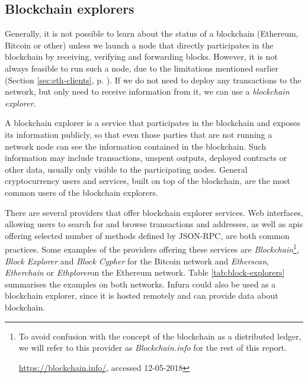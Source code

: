 \subsection{Blockchain explorers}\label{sec:block-explorers}
Generally, it is not possible to learn about the status of a blockchain (Ethereum, Bitcoin or other) unless we launch a node that directly participates in the blockchain by receiving, verifying and forwarding blocks. However, it is not always feasible to run such a node, due to the limitations mentioned earlier (Section \ref{sec:eth-clients}, p. \pageref{sec:eth-clients}). If we do not need to deploy any transactions to the network, but only need to receive information from it, we can use a \textit{blockchain explorer}\footnotemark.
% 

A blockchain explorer is a service that participates in the blockchain and exposes its information publicly, so that even those parties that are not running a network node can see the information contained in the blockchain. Such information may include transactions, unspent outputs, deployed contracts or other data, usually only visible to the participating nodes. General cryptocurrency users and services, built on top of the blockchain, are the most common users of the blockchain explorers\footnotemark.
%

There are several providers that offer blockchain explorer services. Web interfaces, allowing users to search for and browse transactions and addresses, as well as \acrshort{api}s offering selected number of methods defined by JSON-RPC, are both common practices. Some examples of the providers offering these services are \textit{Blockchain}\footnote{To avoid confusion with the concept of the blockchain as a distributed ledger, we will refer to this provider as \textit{Blockchain.info} for the rest of this report.

\url{https://blockchain.info/}, accessed 12-05-2018}, \textit{Block Explorer} and \textit{Block Cypher} for the Bitcoin network and \textit{Etherscan}, \textit{Etherchain} or \textit{Ethplorer}\footnotemark on the Ethereum network. Table \ref{tab:block-explorers} summarises the examples on both networks. Infura could also be used as a blockchain explorer, since it is hosted remotely and can provide data about blockchain.
% 

